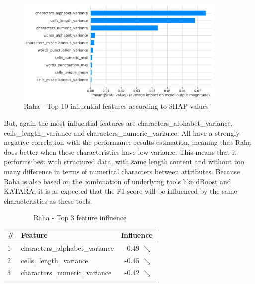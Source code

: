 \begin{figure}[H]
    \centering
    \includegraphics[width=0.9\textwidth]{thesis/Figures/RQ4/Shap_Raha.pdf}
    \caption{Raha - Top 10 influential features according to SHAP values}
    \label{fig:most_impact_features_raha}
\end{figure}

But, again the most influential features are characters\_alphabet\_variance, cells\_length\_variance and characters\_numeric\_variance. All have a strongly negative correlation with the performance results estimation, meaning that Raha does better when these characteristics have low variance. This means that it performs best with structured data, with same length content and without too many difference in terms of numerical characters between attributes. Because Raha is also based on the combination of underlying tools like dBoost and KATARA, it is as expected that the F1 score will be influenced by the same characteristics as these tools.

\begin{table}[H]
\centering
\begin{tabular}{llr}
\toprule
 \# &                         Feature &         Influence \\
\midrule
 1 &  characters\_alphabet\_variance &  -0.49 $\searrow$ \\
 2 &         cells\_length\_variance &  -0.45 $\searrow$ \\
 3 &   characters\_numeric\_variance &  -0.42 $\searrow$ \\
\bottomrule
\end{tabular}
\caption{Raha - Top 3 feature influence}
\label{tab:top_influence_features_raha}
\end{table}